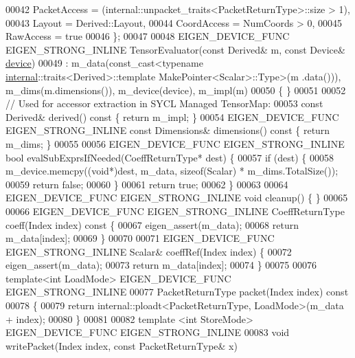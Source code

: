 \begin{DoxyCode}
00042     PacketAccess = (internal::unpacket\_traits<PacketReturnType>::size > 1),
00043     Layout = Derived::Layout,
00044     CoordAccess = NumCoords > 0,
00045     RawAccess = \textcolor{keyword}{true}
00046   \};
00047 
00048   EIGEN\_DEVICE\_FUNC EIGEN\_STRONG\_INLINE TensorEvaluator(\textcolor{keyword}{const} Derived& m, \textcolor{keyword}{const} Device& 
      \hyperlink{struct_eigen_1_1_tensor_evaluator_a98b51809ed8f7a1f736eb7b952b9636e}{device})
00049       : m\_data(const\_cast<typename \hyperlink{namespaceinternal}{internal}::traits<Derived>::template MakePointer<Scalar>::Type>(m
      .data())), m\_dims(m.dimensions()), m\_device(device), m\_impl(m)
00050   \{ \}
00051 
00052   \textcolor{comment}{// Used for accessor extraction in SYCL Managed TensorMap:}
00053   \textcolor{keyword}{const} Derived& derived()\textcolor{keyword}{ const }\{ \textcolor{keywordflow}{return} m\_impl; \}
00054   EIGEN\_DEVICE\_FUNC EIGEN\_STRONG\_INLINE \textcolor{keyword}{const} Dimensions& dimensions()\textcolor{keyword}{ const }\{ \textcolor{keywordflow}{return} m\_dims; \}
00055 
00056   EIGEN\_DEVICE\_FUNC EIGEN\_STRONG\_INLINE \textcolor{keywordtype}{bool} evalSubExprsIfNeeded(CoeffReturnType* dest) \{
00057     \textcolor{keywordflow}{if} (dest) \{
00058       m\_device.memcpy((\textcolor{keywordtype}{void}*)dest, m\_data, \textcolor{keyword}{sizeof}(Scalar) * m\_dims.TotalSize());
00059       \textcolor{keywordflow}{return} \textcolor{keyword}{false};
00060     \}
00061     \textcolor{keywordflow}{return} \textcolor{keyword}{true};
00062   \}
00063 
00064   EIGEN\_DEVICE\_FUNC EIGEN\_STRONG\_INLINE \textcolor{keywordtype}{void} cleanup() \{ \}
00065 
00066   EIGEN\_DEVICE\_FUNC EIGEN\_STRONG\_INLINE CoeffReturnType coeff(Index index)\textcolor{keyword}{ const }\{
00067     eigen\_assert(m\_data);
00068     \textcolor{keywordflow}{return} m\_data[index];
00069   \}
00070 
00071   EIGEN\_DEVICE\_FUNC EIGEN\_STRONG\_INLINE Scalar& coeffRef(Index index) \{
00072     eigen\_assert(m\_data);
00073     \textcolor{keywordflow}{return} m\_data[index];
00074   \}
00075 
00076   \textcolor{keyword}{template}<\textcolor{keywordtype}{int} LoadMode> EIGEN\_DEVICE\_FUNC EIGEN\_STRONG\_INLINE
00077   PacketReturnType packet(Index index)\textcolor{keyword}{ const}
00078 \textcolor{keyword}{  }\{
00079     \textcolor{keywordflow}{return} internal::ploadt<PacketReturnType, LoadMode>(m\_data + index);
00080   \}
00081 
00082   \textcolor{keyword}{template} <\textcolor{keywordtype}{int} StoreMode> EIGEN\_DEVICE\_FUNC EIGEN\_STRONG\_INLINE
00083   \textcolor{keywordtype}{void} writePacket(Index index, \textcolor{keyword}{const} PacketReturnType& x)

\end{DoxyCode}
